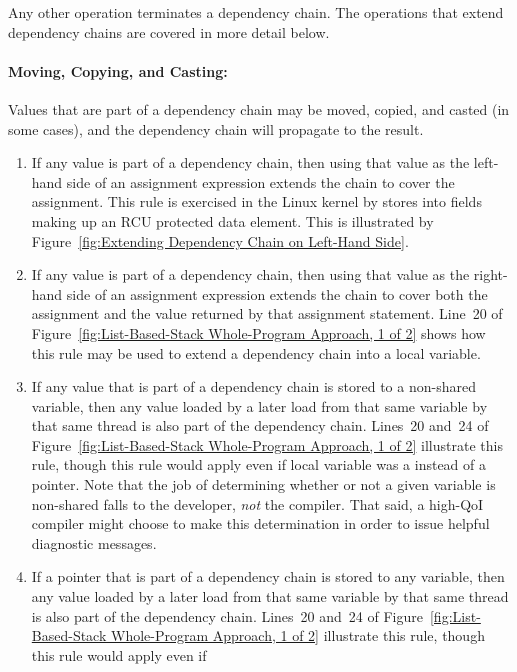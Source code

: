 \documentclass[letterpaper,twocolumn,10pt]{article}
\begin{document}
Any other operation terminates a dependency chain.
The operations that extend dependency chains are covered in more
detail below.

\paragraph{Moving, Copying, and Casting:}

Values that are part of a dependency chain may be moved, copied,
and casted (in some cases), and the dependency chain will propagate
to the result.

\begin{enumerate}
\item	If any value is part of a dependency chain, then using
	that value as the left-hand side of an assignment expression
	extends the chain to cover the assignment.
	This rule is exercised in the Linux kernel by stores into
	fields making up an RCU protected data element.
	This is illustrated by
	Figure~\ref{fig:Extending Dependency Chain on Left-Hand Side}.
\item	If any value is part of a dependency chain, then using that
	value as the right-hand side of an assignment expression
	extends the chain to cover both the assignment and the value
	returned by that assignment statement.
	Line~20 of
	Figure~\ref{fig:List-Based-Stack Whole-Program Approach, 1 of 2}
	shows how this rule may be used to extend a dependency chain
	into a local variable.
\item	If any value that is part of a dependency chain is stored to
	a non-shared variable, then any value loaded by a later load
	from that same variable by that same thread is also part of
	the dependency chain.
	Lines~20 and~24 of
	Figure~\ref{fig:List-Based-Stack Whole-Program Approach, 1 of 2}
	illustrate this rule, though this rule would apply even if
	local variable  was a  instead of a pointer.
	Note that the job of determining whether or not a given variable
	is non-shared falls to the developer, \emph{not} the compiler.
	That said, a high-QoI compiler might choose to make this determination
	in order to issue helpful diagnostic messages.
\item	If a pointer that is part of a dependency chain is stored to
	any variable, then any value loaded by a later load
	from that same variable by that same thread is also part of
	the dependency chain.
	Lines~20 and~24 of
	Figure~\ref{fig:List-Based-Stack Whole-Program Approach, 1 of 2}
	illustrate this rule, though this rule would apply even if

\end{enumerate}
\end{document}
